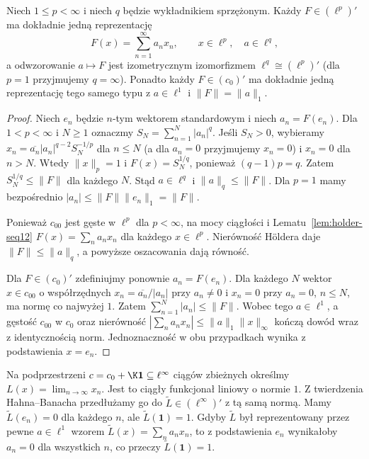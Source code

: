 \begin{twierdzenie}
\label{thm:dual-sequences12}
Niech $1\le p<\infty$ i niech $q$ będzie wykładnikiem sprzężonym.
Każdy $F\in(\ell^p)'$ ma dokładnie jedną reprezentację
\[
 F(x)=\sum_{n=1}^\infty a_nx_n,\qquad x\in\ell^p,
 \quad a\in\ell^q,
\]
a odwzorowanie $a\mapsto F$ jest izometrycznym izomorfizmem
$\ell^q\cong(\ell^p)'$ (dla $p=1$ przyjmujemy $q=\infty$).
Ponadto każdy $F\in(c_0)'$ ma dokładnie jedną reprezentację
tego samego typu z $a\in\ell^1$ i $\|F\|=\|a\|_1$.
\end{twierdzenie}
\begin{proof}
Niech $e_n$ będzie $n$-tym wektorem standardowym i niech
$a_n=F(e_n)$. Dla $1<p<\infty$ i $N\ge1$ oznaczmy
$S_N=\sum_{n=1}^N|a_n|^q$. Jeśli $S_N>0$, wybieramy
$x_n=\overline{a_n}|a_n|^{q-2}S_N^{-1/p}$
dla $n\le N$ (a dla $a_n=0$ przyjmujemy $x_n=0$)
i $x_n=0$ dla $n>N$. Wtedy
$\|x\|_p=1$ i $F(x)=S_N^{1/q}$, ponieważ
$(q-1)p=q$. Zatem $S_N^{1/q}\le\|F\|$ dla każdego $N$.
Stąd $a\in\ell^q$ i $\|a\|_q\le\|F\|$.
Dla $p=1$ mamy bezpośrednio
$|a_n|\le\|F\|\|e_n\|_1=\|F\|$.

Ponieważ $c_{00}$ jest gęste w $\ell^p$ dla $p<\infty$,
na mocy ciągłości i Lematu~\ref{lem:holder-seq12}
$F(x)=\sum_na_nx_n$ dla każdego $x\in\ell^p$.
Nierówność H\"oldera daje $\|F\|\le\|a\|_q$,
a powyższe oszacowania dają równość.

Dla $F\in(c_0)'$ zdefiniujmy ponownie $a_n=F(e_n)$.
Dla każdego $N$ wektor $x\in c_{00}$ o współrzędnych
$x_n=\overline{a_n}/|a_n|$ przy $a_n\ne0$ i
$x_n=0$ przy $a_n=0$, $n\le N$, ma normę co najwyżej $1$.
Zatem $\sum_{n=1}^N|a_n|\le\|F\|$.
Wobec tego $a\in\ell^1$, a gęstość $c_{00}$ w $c_0$
oraz nierówność $|\sum_na_nx_n|\le\|a\|_1\|x\|_\infty$
kończą dowód wraz z identycznością norm.
Jednoznaczność w obu przypadkach wynika z podstawienia $x=e_n$.
\end{proof}

\begin{przyklad}
\label{ex:linfty-dual-seq12}
Na podprzestrzeni $c=c_0+\K\mathbf1\subseteq\ell^\infty$
ciągów zbieżnych określmy $L(x)=\lim_{n\to\infty}x_n$.
Jest to ciągły funkcjonał liniowy o normie $1$.
Z twierdzenia Hahna--Banacha przedłużamy go do
$\widetilde L\in(\ell^\infty)'$ z tą samą normą.
Mamy $\widetilde L(e_n)=0$ dla każdego $n$, ale
$\widetilde L(\mathbf1)=1$. Gdyby $\widetilde L$
był reprezentowany przez pewne $a\in\ell^1$ wzorem
$\widetilde L(x)=\sum_na_nx_n$, to z podstawienia $e_n$
wynikałoby $a_n=0$ dla wszystkich $n$, co przeczy
$\widetilde L(\mathbf1)=1$.
\end{przyklad}

